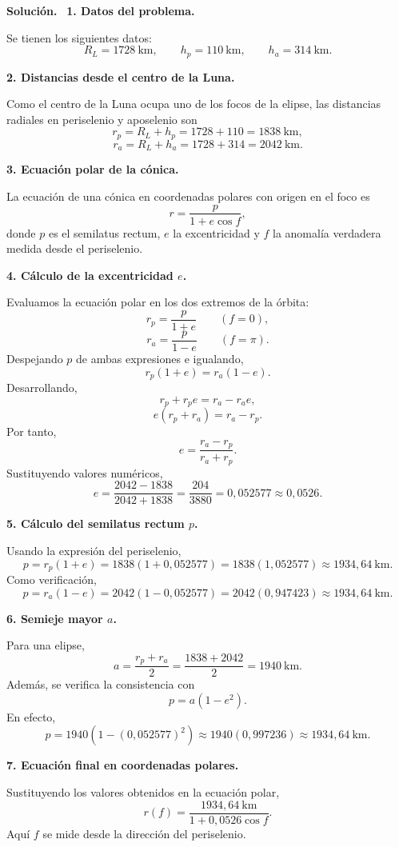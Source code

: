 \documentclass[11pt]{article}
\theoremstyle{prismstyle}
\newenvironment{solution}[1][Solución]
  {\par\textbf{#1.}\ }
  {\par}
\begin{document}
\begin{solution}
\textbf{1. Datos del problema.}

Se tienen los siguientes datos:
\[
R_L = 1728\ \text{km},
\qquad
h_p = 110\ \text{km},
\qquad
h_a = 314\ \text{km}.
\]

\textbf{2. Distancias desde el centro de la Luna.}

Como el centro de la Luna ocupa uno de los focos de la elipse, las distancias radiales en periselenio y aposelenio son
\[
r_p = R_L + h_p = 1728 + 110 = 1838\ \text{km},
\]
\[
r_a = R_L + h_a = 1728 + 314 = 2042\ \text{km}.
\]

\textbf{3. Ecuación polar de la cónica.}

La ecuación de una cónica en coordenadas polares con origen en el foco es
\[
r = \frac{p}{1+e\cos f},
\]
donde $p$ es el semilatus rectum, $e$ la excentricidad y $f$ la anomalía verdadera medida desde el periselenio.

\textbf{4. Cálculo de la excentricidad $e$.}

Evaluamos la ecuación polar en los dos extremos de la órbita:
\[
r_p = \frac{p}{1+e}
\qquad (f=0),
\]
\[
r_a = \frac{p}{1-e}
\qquad (f=\pi).
\]
Despejando $p$ de ambas expresiones e igualando,
\[
r_p(1+e) = r_a(1-e).
\]
Desarrollando,
\[
r_p + r_pe = r_a - r_ae,
\]
\[
e(r_p+r_a) = r_a-r_p.
\]
Por tanto,
\[
\boxed{e = \frac{r_a-r_p}{r_a+r_p}}.
\]
Sustituyendo valores numéricos,
\[
e = \frac{2042-1838}{2042+1838} = \frac{204}{3880} = 0{,}052577 \approx \boxed{0{,}0526}.
\]

\textbf{5. Cálculo del semilatus rectum $p$.}

Usando la expresión del periselenio,
\[
p = r_p(1+e) = 1838(1+0{,}052577) = 1838(1{,}052577) \approx \boxed{1934{,}64\ \text{km}}.
\]
Como verificación,
\[
p = r_a(1-e) = 2042(1-0{,}052577) = 2042(0{,}947423) \approx 1934{,}64\ \text{km}.
\]

\textbf{6. Semieje mayor $a$.}

Para una elipse,
\[
a = \frac{r_p+r_a}{2} = \frac{1838+2042}{2} = \boxed{1940\ \text{km}}.
\]
Además, se verifica la consistencia con
\[
p = a(1-e^2).
\]
En efecto,
\[
p = 1940\left(1-(0{,}052577)^2\right) \approx 1940(0{,}997236) \approx 1934{,}64\ \text{km}.
\]

\textbf{7. Ecuación final en coordenadas polares.}

Sustituyendo los valores obtenidos en la ecuación polar,
\[
\boxed{r(f) = \frac{1934{,}64\ \text{km}}{1+0{,}0526\cos f}}.
\]
Aquí $f$ se mide desde la dirección del periselenio.


\end{solution}
\end{document}
